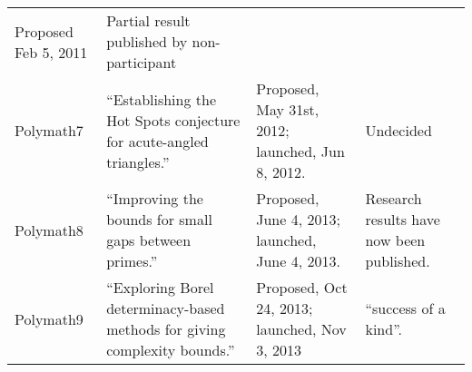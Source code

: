 \documentclass[article, floatfix, groupaddress, prb]{revtex4-1}
\begin{document}
\begin{longtable}[c]{@{}llll@{}}
\begin{minipage}[t]{0.09\columnwidth}
Proposed Feb 5, 2011
\strut\end{minipage} &
\begin{minipage}[t]{0.09\columnwidth}\raggedright\strut
Partial result published by non-participant
\strut\end{minipage}\tabularnewline
\begin{minipage}[t]{0.11\columnwidth}\raggedright\strut
Polymath7
\strut\end{minipage} &
\begin{minipage}[t]{0.10\columnwidth}\raggedright\strut
``Establishing the Hot Spots conjecture for acute-angled triangles.''
\strut\end{minipage} &
\begin{minipage}[t]{0.09\columnwidth}\raggedright\strut
Proposed, May 31st, 2012; launched, Jun 8, 2012.
\strut\end{minipage} &
\begin{minipage}[t]{0.09\columnwidth}\raggedright\strut
Undecided
\strut\end{minipage}\tabularnewline
\begin{minipage}[t]{0.11\columnwidth}\raggedright\strut
Polymath8
\strut\end{minipage} &
\begin{minipage}[t]{0.10\columnwidth}\raggedright\strut
``Improving the bounds for small gaps between primes.''
\strut\end{minipage} &
\begin{minipage}[t]{0.09\columnwidth}\raggedright\strut
Proposed, June 4, 2013; launched, June 4, 2013.
\strut\end{minipage} &
\begin{minipage}[t]{0.09\columnwidth}\raggedright\strut
Research results have now been published.
\strut\end{minipage}\tabularnewline
\begin{minipage}[t]{0.11\columnwidth}\raggedright\strut
Polymath9
\strut\end{minipage} &
\begin{minipage}[t]{0.10\columnwidth}\raggedright\strut
``Exploring Borel determinacy-based methods for giving complexity
bounds.''
\strut\end{minipage} &
\begin{minipage}[t]{0.09\columnwidth}\raggedright\strut
Proposed, Oct 24, 2013; launched, Nov 3, 2013
\strut\end{minipage} &
\begin{minipage}[t]{0.09\columnwidth}\raggedright\strut
``success of a kind''.

\end{minipage}
\end{longtable}
\end{document}
